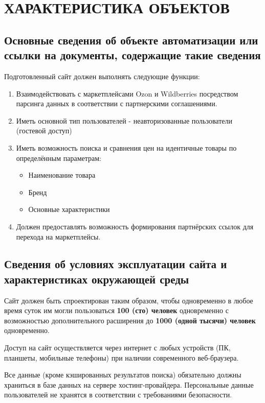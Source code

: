 \documentclass[a4paper,12pt]{article}
\begin{document}
\section{ХАРАКТЕРИСТИКА ОБЪЕКТОВ}

\subsection{Основные сведения об объекте автоматизации или ссылки на документы, содержащие такие сведения}

Подготовленный сайт должен выполнять следующие функции:

\begin{enumerate}
	\item Взаимодействовать с маркетплейсами Ozon и Wildberries посредством парсинга данных в соответствии с партнерскими соглашениями.
	
	\item Иметь основной тип пользователей - неавторизованные пользователи (гостевой доступ)

	
	\item Иметь возможность поиска и сравнения цен на идентичные товары по определённым параметрам:
	\begin{itemize}
		\item Наименование товара
		\item Бренд
		\item Основные характеристики
	\end{itemize}
	
	\item Должен предоставлять возможность формирования партнёрских ссылок для перехода на маркетплейсы.
\end{enumerate}

\subsection{Сведения об условиях эксплуатации сайта и характеристиках окружающей среды}

Сайт должен быть спроектирован таким образом, чтобы одновременно в любое время суток им могли пользоваться \textbf{100 (сто) человек} одновременно с возможностью дополнительного расширения до \textbf{1000 (одной тысячи) человек} одновременно.

Доступ на сайт осуществляется через интернет с любых устройств (ПК, планшеты, мобильные телефоны) при наличии современного веб-браузера.

Все данные (кроме кэшированных результатов поиска) обязательно должны храниться в базе данных на сервере хостинг-провайдера. Персональные данные пользователей не хранятся в соответствии с требованиями безопасности.
\end{document}
